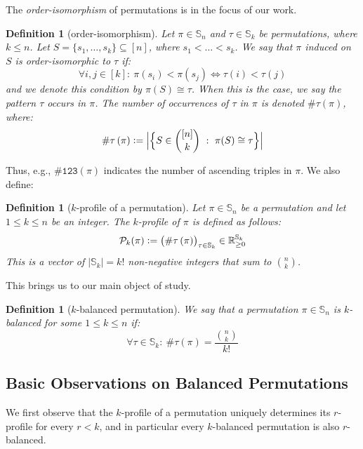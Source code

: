 \documentclass{article}
\newtheorem{definition}[theorem]{Definition}
\newcommand{\Sn}{\mathbb{S}_n}
\newcommand{\RR}{\mathbb{R}}
\newcommand{\pc}[2]{{\# \mathtt{ #1 } \left( #2 \right)}}
\newcommand{\eqdef}{\vcentcolon=}
\theoremstyle{remark}
\theoremstyle{plain}
\begin{document}
The \emph{order-isomorphism} of permutations is in the focus of our work.

\begin{definition}[order-isomorphism]
    \label{defn:order_isom}
    Let $\pi \in \Sn$ and $\tau \in \mathbb{S}_k$ be permutations, where $k \le n$. Let $S = \{s_1, \dots, s_k\} \subseteq [n]$, where $s_1 < \dots < s_k$. We say that $\pi$ induced on $S$ is order-isomorphic to $\tau$ if:
    \[
        \forall i,j \in [k]:\ \pi(s_i) < \pi(s_j) \iff \tau(i) < \tau(j)
    \]    
and we denote this condition by $\pi(S) \cong \tau$.
When this is the case, we say the pattern $\tau$ occurs in $\pi$. 
The number of occurrences of $\tau$ in $\pi$ is denoted $\pc{\tau}{\pi}$, where:
\[
    \pc{\tau}{\pi} \eqdef \Big| \Big\{ S \in \binom{[n]}{k}\ :\ \pi(S) \cong \tau \Big\} \Big|
\]
\end{definition}

Thus, e.g., $\pc{123}{\pi}$ indicates the number of ascending triples in $\pi$. 
We also define:

\begin{definition}[$k$-profile of a permutation]
    \label{defn:perm_profile}
    Let $\pi \in \Sn$ be a permutation and let $1 \le k \le n$ be an integer. The $k$-profile of $\pi$ is defined as follows:
    \[
        \mathcal{P}_k(\pi) \eqdef \big( \pc{\tau}{\pi} \big)_{\tau \in \mathbb{S}_k} \in \RR_{\ge 0}^{\mathbb{S}_k}
    \]
This is a vector of $|\mathbb{S}_k|=k!$ non-negative integers that sum to $\binom{n}{k}$.
\end{definition}

This brings us to our main object of study.

\begin{definition}[$k$-balanced permutation] 
We say that a permutation $\pi \in \Sn$ is $k$-balanced for some $1 \leq k \le n$ if:
    \[
        \forall \tau \in \mathbb{S}_k:\ \pc{\tau}{\pi} = \frac{\binom{n}{k}}{k!}
    \]
\end{definition}

\subsection{Basic Observations on Balanced Permutations}

We first observe that
the $k$-profile of a permutation uniquely determines its $r$-profile
for every $r<k$, and in particular
every $k$-balanced permutation is also $r$-balanced.  
\end{document}
